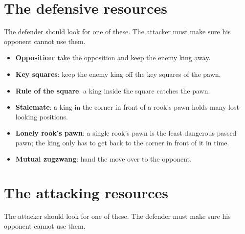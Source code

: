 
\section*{The defensive resources}
The defender should look for one of these. The attacker must make sure his opponent cannot use them.

\begin{itemize}
\item \textbf{Opposition}: take the opposition and keep the enemy king away.

\item \textbf{Key squares}: keep the enemy king off the key squares of the pawn.

\item \textbf{Rule of the square}: a king inside the square catches the pawn.

\item \textbf{Stalemate}: a king in the corner in front of a rook's pawn holds many lost-looking positions.

\item \textbf{Lonely rook's pawn}: a single rook's pawn is the least dangerous passed pawn; the king only has to get back to the corner in front of it in time.

\item \textbf{Mutual zugzwang}: hand the move over to the opponent.
\end{itemize}

\section*{The attacking resources}
The attacker should look for one of these. The defender must make sure his opponent cannot use them.

